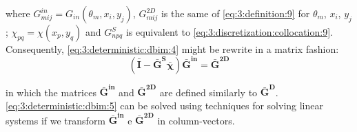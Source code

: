			\noindent where $G^{in}_{mij} = G_{in}(\theta_m,x_i,y_j)$, $G^{2D}_{mij}$ is the same of \eqref{eq:3:definition:9} for $\theta_m$, $x_i$, $y_j$; $\chi_{pq}=\chi(x_p, y_q)$ and $G^{S}_{npq}$ is equivalent to \eqref{eq:3:discretization:collocation:9}. Consequently, \eqref{eq:3:deterministic:dbim:4} might be rewrite in a matrix fashion:
			\begin{equation}
				\left(\mathbf{\bar{I}} - \mathbf{\bar{G}^S}\boldsymbol{\bar{\chi}}\right)\mathbf{\bar{G}^{in}} = \mathbf{\bar{G}^{2D}} \label{eq:3:deterministic:dbim:5}
			\end{equation}
		
			\noindent in which the matrices $\mathbf{\bar{G}^{in}}$ and $\mathbf{\bar{G}^{2D}} $ are defined similarly to $\mathbf{\bar{G}^D}$. \eqref{eq:3:deterministic:dbim:5} can be solved using techniques for solving linear systems if we transform $\mathbf{\bar{G}^{in}}$ e $\mathbf{\bar{G}^{2D}}$ in column-vectors.
			
